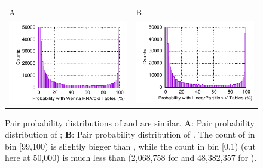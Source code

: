 \iftrue
\begin{figure}[h]
  \centering
\begin{tabular}{ll}
{\large\sf A} & {\large\sf B}\\
    \includegraphics[width=.45\textwidth]{figs/overall_vienna_prob_bin_count}
    &
    \hspace{-0.1cm}
    \includegraphics[width=.45\textwidth]{figs/overall_lpv_prob_bin_count}
  \end{tabular} 
  \caption{Pair probability distributions of \viennarnafold and \linearpartitionv are similar.
  {\bf A}: 
  Pair probability distribution of \viennarnafold;
  {\bf B}: 
  Pair probability distribution of \linearpartitionv.
  The count of \linearpartitionv in bin [99,100) is slightly bigger than \viennarnafold, 
  while the count in bin [0,1) (cut here at 50,000) is much less than \viennarnafold 
  (2,068,758 for \linearpartitionv and 48,382,357 for \viennarnafold).
  \label{fig:bin_counts}}
\end{figure}
\fi

% 




